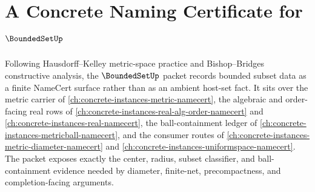 \chapter{A Concrete Naming Certificate for $\BoundedSetUp$}
\label{ch:concrete-instances-boundedset-namecert}

Following Hausdorff--Kelley metric-space practice and Bishop--Bridges constructive analysis, the $\BoundedSetUp$ packet records bounded subset data as a finite NameCert surface rather than as an ambient host-set fact. It sits over the metric carrier of \autoref{ch:concrete-instances-metric-namecert}, the algebraic and order-facing real rows of \autoref{ch:concrete-instances-real-alg-order-namecert} and \autoref{ch:concrete-instances-real-namecert}, the ball-containment ledger of \autoref{ch:concrete-instances-metricball-namecert}, and the consumer routes of \autoref{ch:concrete-instances-metric-diameter-namecert} and \autoref{ch:concrete-instances-uniformspace-namecert}. The packet exposes exactly the center, radius, subset classifier, and ball-containment evidence needed by diameter, finite-net, precompactness, and completion-facing arguments.

